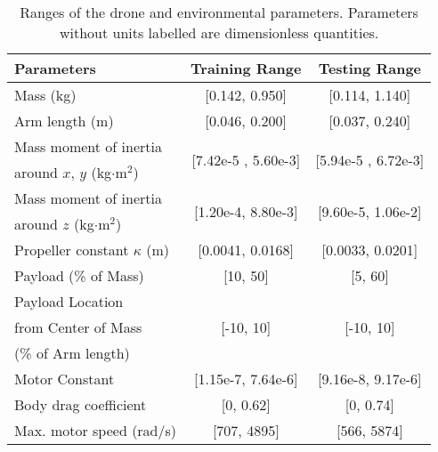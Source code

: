   
\begin{table}[t]
\caption{\label{tab:randomization} Ranges of the drone and environmental parameters. Parameters without units labelled are dimensionless quantities.}
\setlength{\tabcolsep}{5.5pt}
\begin{center}
\begin{tabular}{lcc}
\toprule
 \textbf{Parameters} & \textbf{Training Range} & \textbf{Testing Range} \\
 \midrule
 Mass (kg) & [0.142, 0.950]  & [0.114, 1.140]  \\
 Arm length (m) & [0.046, 0.200] & [0.037, 0.240] \\
 Mass moment of inertia  & \multirow{2}{*}{ [7.42e-5 , 5.60e-3]}&\multirow{2}{*}{ [5.94e-5 , 6.72e-3]} \\
 around $x$, $y$ (kg$\cdot$m$^2$)&&\\
  Mass moment of inertia  & \multirow{2}{*}{[1.20e-4, 8.80e-3]} &  \multirow{2}{*}{[9.60e-5, 1.06e-2]} \\
  around $z$ (kg$\cdot$m$^2$)&&\\
 Propeller constant $\kappa$ (m) & [0.0041, 0.0168] & [0.0033, 0.0201]\\
 Payload (\% of Mass)  & [10, 50] & [5, 60] \\
 Payload Location & \multirow{3}{*}{[-10, 10]}  & \multirow{3}{*}{[-10, 10]}  \\
 from Center of Mass&&\\
 (\% of Arm length)&&\\
 Motor Constant & [1.15e-7, 7.64e-6] & [9.16e-8, 9.17e-6]  \\
 Body drag coefficient & [0, 0.62]& [0, 0.74] \\
 Max. motor speed (rad/s) & [707, 4895] & [566, 5874] \\
\bottomrule
\end{tabular}
\end{center}
\end{table}



